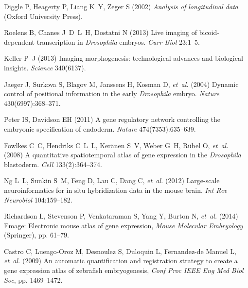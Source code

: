 \documentclass{pnastwo}
\begin{document}
\begin{article}
\begin{thebibliography}{10}

Diggle P, Heagerty P, Liang K~Y, Zeger S (2002) \textit{Analysis of
  longitudinal data} (Oxford University Press).

Roelens B, Chanes J~D~L~H, Dostatni N (2013) Live imaging of bicoid-dependent
  transcription in \textit{{D}rosophila} embryos. \textit{Curr Biol}
  23:1--5.

Keller P~J (2013) Imaging morphogenesis: technological advances and biological
  insights. \textit{Science} 340(6137).

Jaeger J, Surkova S, Blagov M, Janssens H, Kosman D, \textit{et~al.} (2004)
  Dynamic control of positional information in the early \textit{{D}rosophila}
  embryo. \textit{Nature} 430(6997):368--371.


Peter IS, Davidson EH (2011) A gene regulatory network controlling the embryonic
specification of endoderm. \textit{Nature} 474(7353):635--639.


Fowlkes C~C, Hendriks C~L~L, Ker{\"a}nen S~V, Weber G~H, R{\"u}bel O,
  \textit{et~al.} (2008) A quantitative spatiotemporal atlas of gene expression
  in the \textit{{D}rosophila} blastoderm. \textit{Cell} 133(2):364--374.

Ng L~L, Sunkin S~M, Feng D, Lau C, Dang C, \textit{et~al.} (2012) Large-scale
  neuroinformatics for in situ hybridization data in the mouse brain.
  \textit{Int Rev Neurobiol} 104:159--182.

Richardson L, Stevenson P, Venkataraman S, Yang Y, Burton N, \textit{et~al.}
  (2014) Emage: Electronic mouse atlas of gene expression, \textit{Mouse
  Molecular Embryology} (Springer), pp. 61--79.

Castro C, Luengo-Oroz M, Desnoulez S, Duloquin L, Fernandez-de Manuel L,
  \textit{et~al.} (2009) An automatic quantification and registration strategy
  to create a gene expression atlas of zebrafish embryogenesis,
  \textit{Conf Proc IEEE Eng Med Biol Soc}, pp. 1469--1472.


\end{thebibliography}
\end{article}
\end{document}
